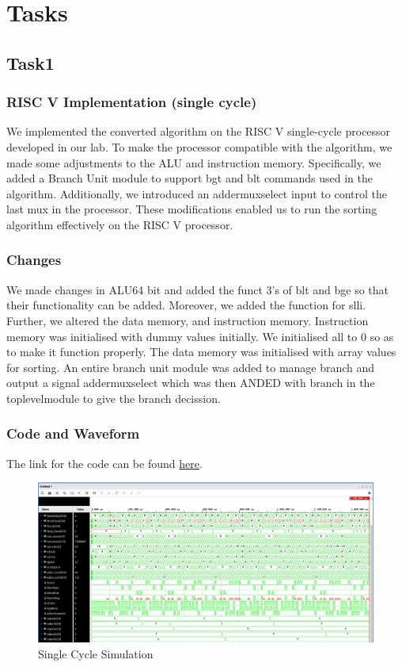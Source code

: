 \documentclass{report}
\theoremstyle{mytheoremstyle}
\theoremstyle{mytheoremstyle}
\theoremstyle{myproblemstyle}
\begin{document}
\chapter{Tasks}
\section{Task1}
\subsection{RISC V Implementation (single cycle)}

    We implemented the converted algorithm on the RISC V single-cycle processor developed in our lab. To make the processor compatible with the algorithm, we made some adjustments to the ALU and instruction memory. Specifically, we added a Branch Unit module to support bgt and blt commands used in the algorithm. Additionally, we introduced an addermuxselect input to control the last mux in the processor. These modifications enabled us to run the sorting algorithm effectively on the RISC V processor.
    
\subsection{Changes}
    We made changes in ALU64 bit and added the funct 3's of blt and bge so that their functionality can be added. Moreover, we added the function for slli. Further, we altered the data memory, and instruction memory. Instruction memory was initialised with dummy values initially. We initialised all to 0 so as to make it function properly. The data memory was initialised with array values for sorting. An entire branch unit module was added to manage branch and output a signal addermuxselect which was then ANDED with branch in the toplevelmodule to give the branch decission.
    \pagebreak
\subsection{Code and Waveform}
The link for the code can be found \href{https://github.com/AliMuhammadAsad/Computer-Architecture-Spring-23/tree/main/Single%20Cycle%20RISC%20V%20-%20Project%20Task1}{here}.
\begin{figure}[h]
    \centering
    \includegraphics[scale = 0.5]{SIngleCycleSimulation.jpg}
    \caption{Single Cycle Simulation}
    \label{fig: Single Cycle Simulation}
\end{figure}
\end{document}
